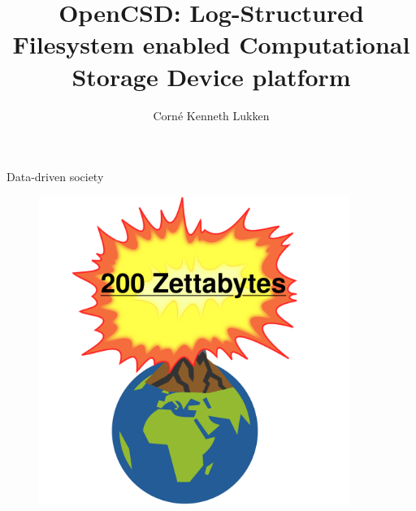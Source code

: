 \documentclass{beamer}
\author{Corné Kenneth Lukken}
\title{OpenCSD: Log-Structured Filesystem enabled Computational Storage Device
platform}
\begin{document}

\frame{\titlepage}
\begin{frame}{Data-driven society}
	\begingroup
	\small
	\begin{figure}
		\centering
		\includegraphics[width=0.9\textwidth]{resources/images/data-problem.png}
	\end{figure}
	\endgroup
\end{frame}
\end{document}
